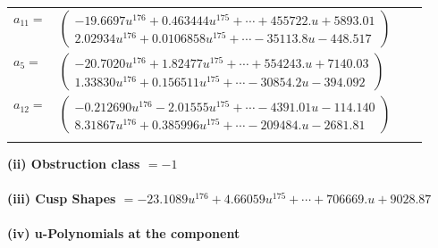 \documentclass[1p]{elsarticle_modified}
\theoremstyle{definition}
\begin{document}
\begin{tabular}{m{7pt} m{180pt} m{7pt} m{180pt} }
\flushright $a_{11}=$&$\begin{pmatrix}-19.6697 u^{176}+0.463444 u^{175}+\cdots+455722. u+5893.01\\2.02934 u^{176}+0.0106858 u^{175}+\cdots-35113.8 u-448.517\end{pmatrix}$ \\
\flushright $a_{5}=$&$\begin{pmatrix}-20.7020 u^{176}+1.82477 u^{175}+\cdots+554243. u+7140.03\\1.33830 u^{176}+0.156511 u^{175}+\cdots-30854.2 u-394.092\end{pmatrix}$ \\
\flushright $a_{12}=$&$\begin{pmatrix}-0.212690 u^{176}-2.01555 u^{175}+\cdots-4391.01 u-114.140\\8.31867 u^{176}+0.385996 u^{175}+\cdots-209484. u-2681.81\end{pmatrix}$\\&\end{tabular}
\flushleft \textbf{(ii) Obstruction class $= -1$}\\~\\
\flushleft \textbf{(iii) Cusp Shapes $= -23.1089 u^{176}+4.66059 u^{175}+\cdots+706669. u+9028.87$}\\~\\
\newpage\renewcommand{\arraystretch}{1}
\flushleft \textbf{(iv) u-Polynomials at the component}\newline \\
\end{document}
